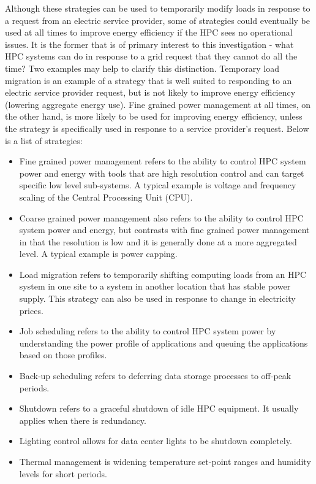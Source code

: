 Although these strategies can be used to temporarily modify loads in response to a request from an 
electric service provider, some of strategies could eventually be used at all times to improve energy 
efficiency if the HPC sees no operational issues. It is the former that is of primary interest to this 
investigation - what HPC systems can do in response to a grid request that they cannot do all the time? 
Two examples may help to clarify this distinction. Temporary load migration is an example of a strategy 
that is well suited to responding to an electric service provider request, but is not likely to improve 
energy efficiency (lowering aggregate energy use). Fine grained power management at all times, on 
the other hand, is more likely to be used for improving energy efficiency, unless the strategy is 
specifically used in response to a service provider's request. 
Below is a list of strategies:

\begin{itemize}
\item Fine grained power management refers to the ability to control HPC system power 
and energy with tools that are high resolution control and can target specific 
low level sub-systems. A typical example is voltage and frequency scaling of the Central Processing Unit (CPU).

\item Coarse grained power management also refers to the ability to control HPC 
system power and energy, but contrasts with fine grained power management in 
that the resolution is low and it is generally done at a more aggregated level. 
A typical example is power capping.

\item Load migration refers to temporarily shifting computing loads from 
an HPC system in one site to a system in another location that has stable power supply. 
This strategy can also be used in response to change in electricity prices.

\item Job scheduling refers to the ability to control HPC system power 
by understanding the power profile of applications and queuing the 
applications based on those profiles.

\item Back-up scheduling refers to deferring data storage processes to off-peak periods.

\item Shutdown refers to a graceful shutdown of idle HPC equipment. It usually 
applies when there is redundancy.

\item Lighting control allows for data center lights to be shutdown completely.

\item Thermal management is widening temperature set-point ranges and 
humidity levels for short periods.
\end{itemize}


